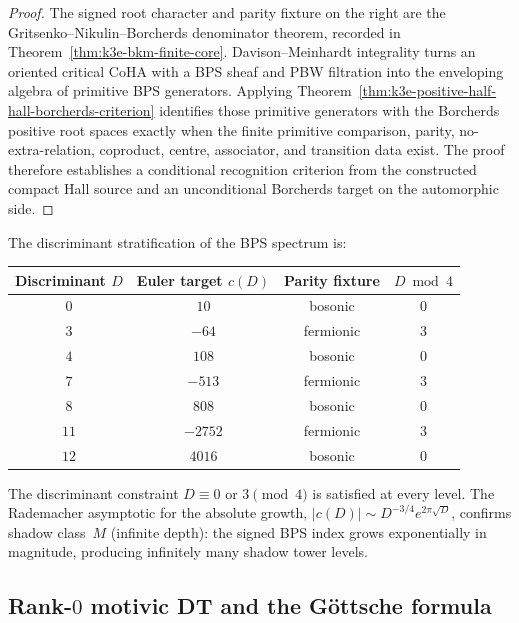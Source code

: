 \begin{proof}
The signed root character and parity fixture on the right are the
Gritsenko--Nikulin--Borcherds denominator theorem, recorded in
Theorem~\ref{thm:k3e-bkm-finite-core}. Davison--Meinhardt integrality
turns an oriented critical CoHA with a BPS sheaf and PBW filtration into
the enveloping algebra of primitive BPS generators. Applying
Theorem~\ref{thm:k3e-positive-half-hall-borcherds-criterion} identifies
those primitive generators with the Borcherds positive root spaces
exactly when the finite primitive comparison, parity, no-extra-relation,
coproduct, centre, associator, and transition data exist. The proof
therefore establishes a conditional recognition criterion from the
constructed compact Hall source and an unconditional Borcherds target
on the automorphic side.
\end{proof}

The discriminant stratification of the BPS spectrum is:

\begin{center}
\renewcommand{\arraystretch}{1.3}
\begin{tabular}{c|ccc}
\textbf{Discriminant $D$} & \textbf{Euler target $c(D)$} & \textbf{Parity fixture} & \textbf{$D \bmod 4$} \\ \hline
$0$ & $10$ & bosonic & $0$ \\
$3$ & $-64$ & fermionic & $3$ \\
$4$ & $108$ & bosonic & $0$ \\
$7$ & $-513$ & fermionic & $3$ \\
$8$ & $808$ & bosonic & $0$ \\
$11$ & $-2752$ & fermionic & $3$ \\
$12$ & $4016$ & bosonic & $0$
\end{tabular}
\end{center}

\noindent The discriminant constraint $D \equiv 0$ or $3 \pmod{4}$ is satisfied at every level. The Rademacher asymptotic for the absolute growth, $|c(D)| \sim D^{-3/4} e^{2\pi\sqrt{D}}$, confirms shadow class~$M$ (infinite depth): the signed BPS index grows exponentially in magnitude, producing infinitely many shadow tower levels.

\subsection{Rank-\texorpdfstring{$0$}{0} motivic DT and the G\"ottsche formula}
\label{subsec:k3e-motivic-dt-rank0}

